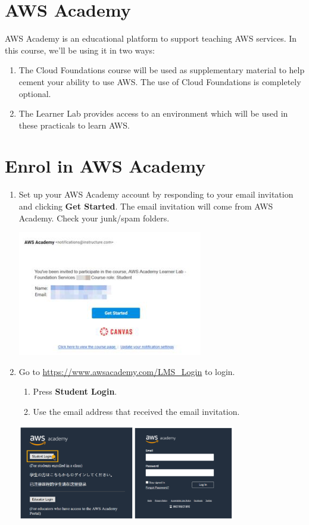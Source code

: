 \documentclass{csse4400}
\begin{document}
\section{AWS Academy}
AWS Academy is an educational platform to support teaching AWS services.
In this course, we'll be using it in two ways:
\begin{enumerate}
    \item The Cloud Foundations course will be used as supplementary material to help cement your ability to use AWS.
          The use of Cloud Foundations is completely optional.
    \item The Learner Lab provides access to an environment which will be used in these practicals to learn AWS. 
\end{enumerate}

\section{Enrol in AWS Academy}

\begin{enumerate}
    \item
        Set up your AWS Academy account by responding to your email invitation and clicking \textbf{Get Started}.
        The email invitation will come from AWS Academy.
        Check your junk/spam folders.

        \includegraphics{images/email-invite}

    \item Go to \url{https://www.awsacademy.com/LMS_Login} to login.
    \begin{enumerate}
        \item Press \textbf{Student Login}.
        \item Use the email address that received the email invitation.
    \end{enumerate}

    \includegraphics[width=0.75\textwidth]{images/labs-login}
\end{enumerate}
\end{document}
